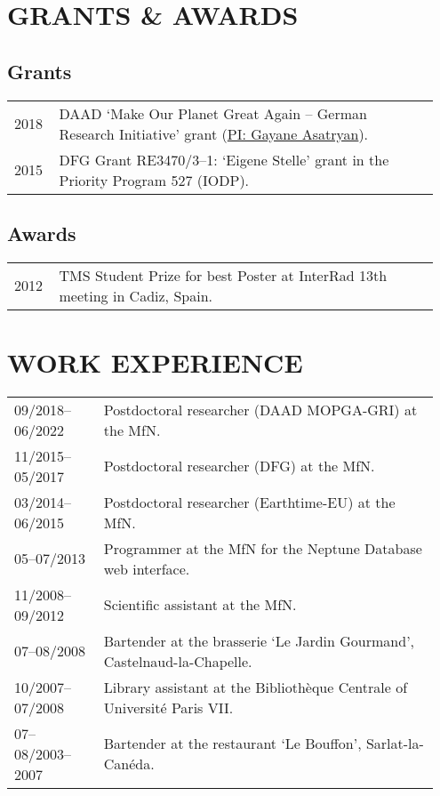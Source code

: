 \documentclass[11pt, a4paper]{article}
\begin{document}
\section{GRANTS \& AWARDS}
\subsection{Grants}
\begin{longtable}{p{0.1\linewidth} P{0.85\linewidth}}
2018 & DAAD `Make Our Planet Great Again -- German Research Initiative' grant (\underline{PI: Gayane Asatryan}).\\
2015 & DFG Grant RE3470/3--1: `Eigene Stelle' grant in the Priority Program 527 (IODP).\\
\end{longtable}
\subsection{Awards}
\begin{longtable}{p{0.1\linewidth} P{0.85\linewidth}}
2012 & TMS Student Prize for best Poster at InterRad 13th meeting in Cadiz, Spain.\\
\end{longtable}

\section{WORK EXPERIENCE}
\begin{longtable}{p{0.2\linewidth} P{0.75\linewidth}}
09/2018--06/2022 & Postdoctoral researcher (DAAD MOPGA-GRI) at the MfN.\\
11/2015--05/2017 & Postdoctoral researcher (DFG) at the MfN.\\
03/2014--06/2015 & Postdoctoral researcher (Earthtime-EU) at the MfN.\\
05--07/2013 & Programmer at the MfN for the Neptune Database web interface.\\
11/2008--09/2012 & Scientific assistant at the MfN.\\
07--08/2008 & Bartender at the brasserie `Le Jardin Gourmand', Castelnaud-la-Chapelle.\\
10/2007--07/2008 & Library assistant at the Biblioth\`{e}que Centrale of Universit\'{e} Paris VII.\\
07--08/2003--2007 & Bartender at the restaurant `Le Bouffon', Sarlat-la-Can\'{e}da.\\
\end{longtable}
\end{document}
